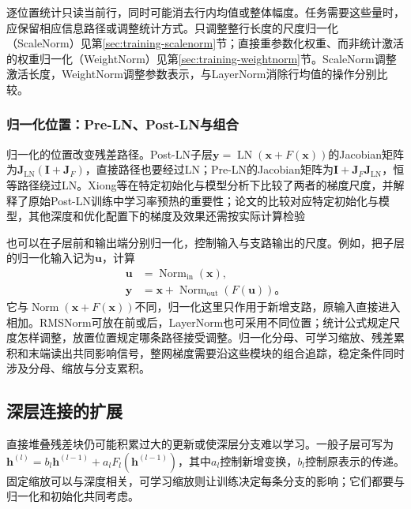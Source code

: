 逐位置统计只读当前行，同时可能消去行内均值或整体幅度。任务需要这些量时，应保留相应信息路径或调整统计方式。只调整整行长度的尺度归一化（ScaleNorm）见第\ref{sec:training-scalenorm}节；直接重参数化权重、而非统计激活的权重归一化（WeightNorm）见第\ref{sec:training-weightnorm}节。ScaleNorm调整激活长度，WeightNorm调整参数表示，与LayerNorm消除行均值的操作分别比较。

\subsubsection{归一化位置：Pre-LN、Post-LN与组合}

归一化的位置改变残差路径。Post-LN子层$\bm y=\operatorname{LN}(\bm x+F(\bm x))$的Jacobian矩阵为$\bm J_{\mathrm{LN}}(\bm I+\bm J_F)$，直接路径也要经过LN；Pre-LN的Jacobian矩阵为$\bm I+\bm J_F\bm J_{\mathrm{LN}}$，恒等路径绕过LN。Xiong等在特定初始化与模型分析下比较了两者的梯度尺度，并解释了原始Post-LN训练中学习率预热的重要性；论文的比较对应特定初始化与模型，其他深度和优化配置下的梯度及效果还需按实际计算检验

也可以在子层前和输出端分别归一化，控制输入与支路输出的尺度。例如，把子层的归一化输入记为$\bm u$，计算
\begin{equation}
  \begin{aligned}
    \bm u&=\operatorname{Norm}_{\mathrm{in}}(\bm x),\\
    \bm y&=\bm x+\operatorname{Norm}_{\mathrm{out}}(F(\bm u))\text{。}
  \end{aligned}
  \label{eq:transformer-combined-normalization}
\end{equation}
它与$\operatorname{Norm}(\bm x+F(\bm x))$不同，归一化这里只作用于新增支路，原输入直接进入相加。RMSNorm可放在前或后，LayerNorm也可采用不同位置；统计公式规定尺度怎样调整，放置位置规定哪条路径接受调整。归一化分母、可学习缩放、残差累积和末端读出共同影响信号，整网梯度需要沿这些模块的组合追踪，稳定条件同时涉及分母、缩放与分支累积。

\subsection{深层连接的扩展}
\label{sec:transformer-deep-connections}

直接堆叠残差块仍可能积累过大的更新或使深层分支难以学习。一般子层可写为$\bm h^{(l)}=b_l\bm h^{(l-1)}+a_lF_l(\bm h^{(l-1)})$，其中$a_l$控制新增变换，$b_l$控制原表示的传递。固定缩放可以与深度相关，可学习缩放则让训练决定每条分支的影响；它们都要与归一化和初始化共同考虑。

